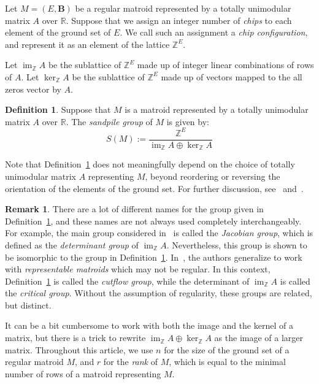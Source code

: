 \documentclass[12p]{amsart}
\numberwithin{equation}{section}
\theoremstyle{plain}
\theoremstyle{definition}
\newtheorem{defn}[thm]{Definition}
\newtheorem{remark}[thm]{Remark}
\newcommand{\Z}{\mathbb {Z}}
\newcommand{\mbf}{\mathbf}
\DeclareMathOperator{\im}{im}
\begin{document}
Let $M = (E,\mbf B)$ be a regular matroid represented by a totally unimodular matrix $A$ over $\mathbb R$. Suppose that we assign an integer number of \emph{chips} to each element of the ground set of $E$.  We call such an assignment a \emph{chip configuration}, and represent it as an element of the lattice $\Z^E$.

Let $\im_{\Z} A$ be the sublattice of $\Z^E$ made up of integer linear combinations of rows of $A$. Let $\ker_{\Z} A$ be the sublattice of $\Z^E$ made up of vectors mapped to the all zeros vector by $A$. 

\begin{defn}\label{def:sandpile}
    Suppose that $M$ is a matroid represented by a totally unimodular matrix $A$ over $\mathbb R$. The \emph{sandpile group} of $M$ is given by:
    \[S(M) := \frac{\Z^E}{\im_ {\Z} A\oplus \ker_ {\Z} A}\]
\end{defn}

Note that Definition~\ref{def:sandpile} does not meaningfully depend on the choice of totally unimodular matrix $A$ representing $M$, beyond reordering or reversing the orientation of the elements of the ground set. For further discussion, see~\cite[Section 2.1]{BBY} and~\cite{SuWagner}. 

\begin{remark}\label{rem:names}
    There are a lot of different names for the group given in Definition~\ref{def:sandpile}, and these names are not always used completely interchangeably. For example, the main group considered in~\cite{BBY} is called the \emph{Jacobian group}, which is defined as the \emph{determinant group} of $\im_ {\Z} A$. Nevertheless, this group is shown to be isomorphic to the group in Definition~\ref{def:sandpile}. In~\cite{CutsFlows}, the authors generalize to work with \emph{representable matroids} which may not be regular. In this context, Definition~\ref{def:sandpile} is called the \emph{cutflow group}, while the determinant of $\im_{\Z} A$ is called the \emph{critical group}. Without the assumption of regularity, these groups are related, but distinct. 
\end{remark}

It can be a bit cumbersome to work with both the image and the kernel of a matrix, but there is a trick to rewrite $\im_ {\Z} A\oplus \ker_ {\Z} A$ as the image of a larger matrix. Throughout this article, we use $n$ for the size of the ground set of a regular matroid $M$, and $r$ for the \emph{rank} of $M$, which is equal to the minimal number of rows of a matroid representing $M$.
\end{document}
